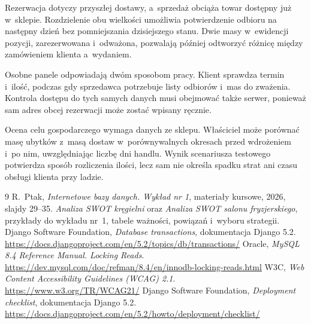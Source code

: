 \documentclass[12pt,a4paper,oneside]{article}
\newcounter{pu}
\begin{document}
Rezerwacja dotyczy przyszłej dostawy, a~sprzedaż obciąża towar dostępny już w~sklepie. Rozdzielenie obu wielkości umożliwia potwierdzenie odbioru na następny dzień bez pomniejszania dzisiejszego stanu. Dwie masy w~ewidencji pozycji, zarezerwowana i~odważona, pozwalają później odtworzyć różnicę między zamówieniem klienta a~wydaniem.

Osobne panele odpowiadają dwóm sposobom pracy. Klient sprawdza termin i~ilość, podczas gdy sprzedawca potrzebuje listy odbiorów i~mas do zważenia. Kontrola dostępu do tych samych danych musi obejmować także serwer, ponieważ sam adres obcej rezerwacji może zostać wpisany ręcznie.

Ocena celu gospodarczego wymaga danych ze sklepu. Właściciel może porównać masę ubytków z~masą dostaw w~porównywalnych okresach przed wdrożeniem i~po nim, uwzględniając liczbę dni handlu. Wynik scenariusza testowego potwierdza sposób rozliczenia ilości, lecz sam nie określa spadku strat ani czasu obsługi klienta przy ladzie.


\clearpage
{}
\renewcommand{\refname}{Literatura i~materiały}
\begin{thebibliography}{9}
 R.~Ptak, \emph{Internetowe bazy danych. Wykład nr 1}, materiały kursowe, 2026, slajdy 29--35.
 \emph{Analiza SWOT kręgielni} oraz \emph{Analiza SWOT salonu fryzjerskiego}, przykłady do wykładu nr~1, tabele ważności, powiązań i~wyboru strategii.
 Django Software Foundation, \emph{Database transactions}, dokumentacja Django 5.2. \url{https://docs.djangoproject.com/en/5.2/topics/db/transactions/}
 Oracle, \emph{MySQL 8.4 Reference Manual. Locking Reads}. \url{https://dev.mysql.com/doc/refman/8.4/en/innodb-locking-reads.html}
 W3C, \emph{Web Content Accessibility Guidelines (WCAG) 2.1}. \url{https://www.w3.org/TR/WCAG21/}
 Django Software Foundation, \emph{Deployment checklist}, dokumentacja Django 5.2. \url{https://docs.djangoproject.com/en/5.2/howto/deployment/checklist/}
\end{thebibliography}

\clearpage
{}
\listoffigures
\end{document}
